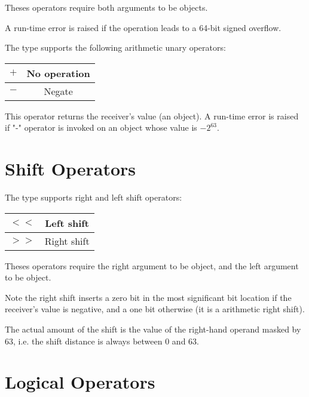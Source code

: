 Theses operators require both arguments to be  objects.\newline

A run-time error is raised if the operation leads to a 64-bit signed overflow.

The  type supports the following arithmetic unary operators:\newline

\begin{tabular}{|c|c|}
\hline
$+$ & No operation \\
\hline
$-$ & Negate \\
\hline
\end{tabular}

This operator returns the receiver's value (an  object). A run-time error is raised if "-" operator is invoked on an object whose value is $-2^{63}$.






\section{Shift Operators}


The  type supports right and left shift operators:\newline

\begin{tabular}{|c|c|}
\hline
$<<$ & Left shift \\
\hline
$>>$ & Right shift \\
\hline
\end{tabular}

Theses operators require the right argument to be  object, and the left argument to be  object.\newline

Note the right shift inserts a zero bit in the most significant bit location if the receiver's value is negative, and a one bit otherwise (it is a arithmetic right shift).\newline

The actual amount of the shift is the value of the right-hand operand masked by 63, i.e. the shift distance is always between 0 and 63.




\section{Logical Operators}

